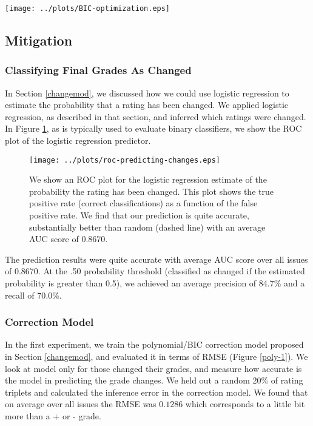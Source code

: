 \begin{figure*}[ht!]
\hspace{-7em}
    \texttt{[image: ../plots/BIC-optimization.eps]}
      \caption{For the participants that changed their ratings, we plot the difference between their rating and the median (X-axis), and the change in their rating (Y-axis). We overlay the optimal polynomial model to represent the relationship $f(x) = y$. Below each plot, is the BIC objective function showing how we picked an optimal degree of polynomial.}
      \label{opt-1}
\end{figure*}

\subsection{Mitigation}

\subsubsection{Classifying Final Grades As Changed}
In Section \ref{changemod}, we discussed how we could use logistic regression to estimate the probability that a rating has been changed.
We applied logistic regression, as described in that section, and inferred which ratings were changed.
In Figure \ref{change-pred-1}, as is typically used to evaluate binary classifiers, we show the ROC plot of the logistic regression predictor.
\begin{figure}[h]
\centering
    \texttt{[image: ../plots/roc-predicting-changes.eps]}
      \caption{We show an ROC plot for the logistic regression estimate of the probability the rating has been changed. This plot shows the true positive rate (correct classifications) as a function of the false positive rate. We find that our prediction is quite accurate, substantially better than random (dashed line) with an average AUC score of 0.8670.}
      \label{change-pred-1}
\end{figure}
The prediction results were quite accurate with average AUC score over all issues of 0.8670.
At the .50 probability threshold (classified as changed if the estimated probability is greater than 0.5), we achieved an average precision of 84.7\% and a recall of 70.0\%.

\subsubsection{Correction Model}
In the first experiment, we train the polynomial/BIC correction model proposed in Section \ref{changemod}, and evaluated it in terms of RMSE (Figure \ref{poly-1}).
We look at model only for those changed their grades, and measure how accurate is the model in predicting the grade changes.
We held out a random 20\% of rating triplets and calculated the inference error in the correction model.
We found that on average over all issues the RMSE was $0.1286$ which corresponds to a little bit more than a + or - grade.

